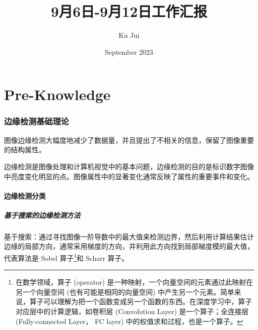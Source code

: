 \documentclass[letterpaper,10pt]{article}
\begin{document}
	
	
	\title{\songti {}9月6日-9月12日工作汇报}
	\author{\textrm{Ku Jui}}
	\date{\textrm{September 2023}}
	\maketitle
	
	\renewcommand{\figurename}{Figure} %
	\renewcommand{\contentsname}{Contents}
	\renewcommand{\tablename}{Table}
	\tableofcontents  %
	
	\part{Pre-Knowledge}	

	\section{边缘检测基础理论}
	
		图像边缘检测大幅度地减少了数据量，并且提出了不相关的信息，保留了图像重要的结构属性。
		
		边缘检测是图像处理和计算机视觉中的基本问题，边缘检测的目的是标识数字图像中亮度变化明显的点。图像属性中的显著变化通常反映了属性的重要事件和变化。
		
		\subsection{边缘检测分类}
		
			\subsubsection{基于搜索的边缘检测方法}
			
			基于搜索：通过寻找图像一阶导数中的最大值来检测边界，然后利用计算结果估计边缘的局部方向，通常采用梯度的方向，并利用此方向找到局部梯度模的最大值，代表算法是 Sobel 算子\footnote{在数学领域，算子 (operator) 是一种映射，一个向量空间的元素通过此映射在另一个向量空间 (也有可能是相同的向量空间) 中产生另一个元素。简单来说，算子可以理解为把一个函数变成另一个函数的东西。在深度学习中，算子对应层中的计算逻辑，如卷积层 (Convolution Layer) 是一个算子；全连接层 (Fully-connected Layer， FC layer) 中的权值求和过程，也是一个算子。}和 Scharr 算子。
			
\end{document}
